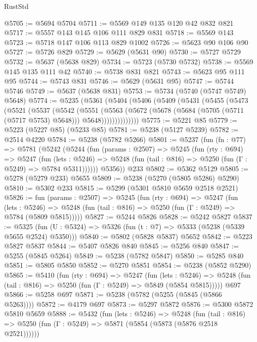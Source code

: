 \begin{lexlean}{RustStd}
\begin{coremodule}
@5705 := @5694 @5704
@5711 := @5569 @149 @135 @120 @42 @832 @821
@5717 := @5557 @143 @145 @106 @111 @829 @831
@5718 := @5569 @143
@5723 := @5718 @147 @106 @113 @829 @1002
@5726 := @5623 @90 @106 @90
@5727 := @5726 @829
@5729 := @5629 (@5631 @90)
@5730 := @5727 @5729
@5732 := @5637 (@5638 @829)
@5734 := @5723 (@5730 @5732)
@5738 := @5569 @145 @135 @111 @42
@5740 := @5738 @831 @821
@5743 := @5623 @95 @111 @95
@5744 := @5743 @831
@5746 := @5629 (@5631 @95)
@5747 := @5744 @5746
@5749 := @5637 (@5638 @831)
@5753 := @5734 (@5740 (@5747 @5749) @5648)
@5774 := @5235
    (@5361
      (@5404
        (@5406
          (@5409
            (@5431
              (@5455
                (@5473
                  (@5521
                    (@5537
                      (@5542
                        (@5551
                          (@5563
                            (@5672
                              (@5678 (@5684 (@5705 (@5711 (@5717 @5753) @5648))) @5648))))))))))))))
@5775 := @5221 @85
@5779 := @5223 (@5227 @85) (@5233 @85)
@5781 := @5238 (@5127 @5239)
@5782 := @2514 @4220
@5784 := @5238 (@5782 @5266)
@5801 := @5237
    (fun (fn : @77) =>
    @5781
      (@5242
        (@5244
          (fun (params : @2507) =>
          @5245
            (fun (rty : @694) =>
            @5247
              (fun (lets : @5246) =>
              @5248 (fun (tail : @816) => @5250 (fun (Γ : @5249) => @5784 @5311))))))
        @5356))
    @233
@5802 := @5362 @5129
@5805 := @5278 (@5279 @233) @5655
@5809 := @5238 (@5270 (@5805 @5286) @5290)
@5810 := @5302 @233
@5815 := @5299 (@5301 @5810 @5659 @2518 @2521)
@5826 := fun (params : @2507) =>
  @5245
    (fun (rty : @694) =>
    @5247
      (fun (lets : @5246) =>
      @5248 (fun (tail : @816) => @5250 (fun (Γ : @5249) => @5784 (@5809 @5815)))))
@5827 := @5244 @5826
@5828 := @5242 @5827
@5837 := @5325 (fun (U : @5324) => @5326 (fun (t : @7) => @5333 (@5238 (@5339 @5655 @2524) @5350)))
@5840 := @5802 (@5828 @5837) @5652
@5842 := @5223 @5827 @5837
@5844 := @5407 @5826 @840
@5845 := @5256 @840
@5847 := @5255 (@5845 @5264)
@5849 := @5238 (@5782 @5847)
@5850 := @5285 @840
@5851 := @5805 @5850
@5852 := @5270 @5851
@5854 := @5238 (@5852 @5290)
@5865 := @5410
    (fun (rty : @694) =>
    @5247
      (fun (lets : @5246) =>
      @5248 (fun (tail : @816) => @5250 (fun (Γ : @5249) => @5849 (@5854 @5815)))))
    @697
@5866 := @5258 @697
@5871 := @5238 (@5782 (@5255 (@5845 (@5866 @5263))))
@5872 := @4179 @697
@5873 := @5297 @5872
@5876 := @5300 @5872 @5810 @5659
@5888 := @5432
    (fun (lets : @5246) =>
    @5248
      (fun (tail : @816) => @5250 (fun (Γ : @5249) => @5871 (@5854 (@5873 (@5876 @2518 @2521))))))

\end{coremodule}
\end{lexlean}
